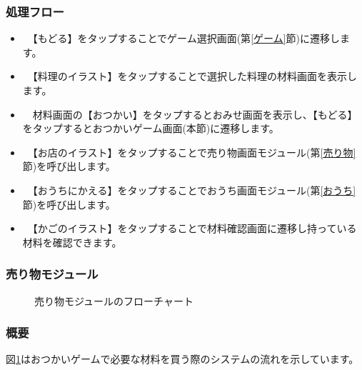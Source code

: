 \documentclass[a4j]{jarticle}
\begin{document}
\subsubsection*{処理フロー}
\begin{itemize}
\item　【もどる】をタップすることでゲーム選択画面(第\ref{ゲーム}節)に遷移します。
\item　【料理のイラスト】をタップすることで選択した料理の材料画面を表示します。
\item　材料画面の【おつかい】をタップするとおみせ画面を表示し、【もどる】をタップするとおつかいゲーム画面(本節)に遷移します。
\item　【お店のイラスト】をタップすることで売り物画面モジュール(第\ref{売り物}節)を呼び出します。
\item　【おうちにかえる】をタップすることでおうち画面モジュール(第\ref{おうち}節)を呼び出します。
\item　【かごのイラスト】をタップすることで材料確認画面に遷移し持っている材料を確認できます。

\end{itemize}


\newpage
\subsubsection{売り物モジュール\label{売り物}}
\begin{figure}[H]
    \begin{center}
    \caption {売り物モジュールのフローチャート}
    \label{urimono}
    \end{center}
\end{figure}

\subsubsection*{概要}
図\ref{urimono}はおつかいゲームで必要な材料を買う際のシステムの流れを示しています。
\end{document}
